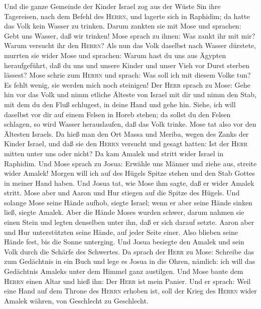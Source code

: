  Und die ganze Gemeinde der Kinder Israel zog aus der
Wüste Sin ihre Tagereisen, nach dem Befehl des \textsc{Herrn}, und
lagerte sich in Raphidim; da hatte das Volk kein Wasser zu trinken.
 Darum zankten sie mit Mose und sprachen: Gebt uns Wasser,
daß wir trinken! Mose sprach zu ihnen: Was zankt ihr mit mir? Warum
versucht ihr den \textsc{Herrn}?  Als nun das Volk
daselbst nach Wasser dürstete, murrten sie wider Mose und sprachen:
Warum hast du uns aus Ägypten heraufgeführt, daß du uns und unsere
Kinder und unser Vieh vor Durst sterben lässest?  Mose
schrie zum \textsc{Herrn} und sprach: Was soll ich mit diesem Volke tun?
Es fehlt wenig, sie werden mich noch steinigen!  Der
\textsc{Herr} sprach zu Mose: Gehe hin vor das Volk und nimm etliche
Älteste von Israel mit dir und nimm den Stab, mit dem du den Fluß
schlugest, in deine Hand und gehe hin.  Siehe, ich will
daselbst vor dir auf einem Felsen in Horeb stehen; da sollst du den
Felsen schlagen, so wird Wasser herauslaufen, daß das Volk trinke. Mose
tat also vor den Ältesten Israels.  Da hieß man den Ort
Massa und Meriba, wegen des Zanks der Kinder Israel, und daß sie den
\textsc{Herrn} versucht und gesagt hatten: Ist der \textsc{Herr} mitten
unter uns oder nicht?  Da kam Amalek und stritt wider
Israel in Raphidim.  Und Mose sprach zu Josua: Erwähle uns
Männer und ziehe aus, streite wider Amalek! Morgen will ich auf des
Hügels Spitze stehen und den Stab Gottes in meiner Hand haben.
 Und Josua tat, wie Mose ihm sagte, daß er wider Amalek
stritt. Mose aber und Aaron und Hur stiegen auf die Spitze des Hügels.
 Und solange Mose seine Hände aufhob, siegte Israel; wenn
er aber seine Hände sinken ließ, siegte Amalek.  Aber die
Hände Moses wurden schwer, darum nahmen sie einen Stein und legten
denselben unter ihn, daß er sich darauf setzte. Aaron aber und Hur
unterstützten seine Hände, auf jeder Seite einer. Also blieben seine
Hände fest, bis die Sonne unterging.  Und Josua besiegte
den Amalek und sein Volk durch die Schärfe des Schwertes.
 Da sprach der \textsc{Herr} zu Mose: Schreibe das zum
Gedächtnis in ein Buch und lege es Josua in die Ohren, nämlich: ich will
das Gedächtnis Amaleks unter dem Himmel ganz austilgen. 
Und Mose baute dem \textsc{Herrn} einen Altar und hieß ihn: Der
\textsc{Herr} ist mein Panier.  Und er sprach: Weil eine
Hand auf dem Throne des \textsc{Herrn} erhoben ist, soll der Krieg des
\textsc{Herrn} wider Amalek währen, von Geschlecht zu Geschlecht.

